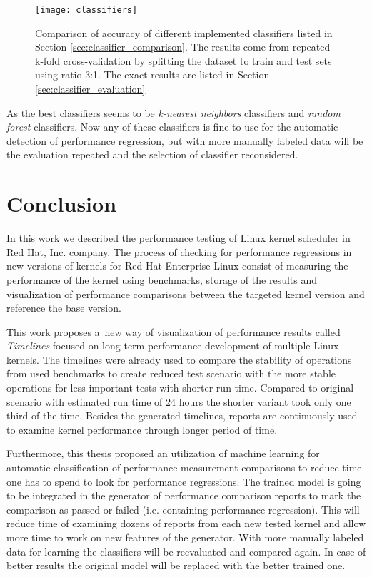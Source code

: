 \begin{figure}
  \centering
  \texttt{[image: classifiers]}
  \caption{Comparison of accuracy of different implemented classifiers listed in Section
    \ref{sec:classifier_comparison}. The results come from repeated k-fold
    cross-validation by splitting the dataset to train and test sets using ratio
    3:1. The exact results are listed in Section \ref{sec:classifier_evaluation}}
  \label{fig:classifiers}
\end{figure}

As the best classifiers seems to be \emph{k-nearest neighbors} classifiers and
\emph{random forest} classifiers. Now any of these classifiers is fine to use
for the automatic detection of performance regression, but with more manually
labeled data will be the evaluation repeated and the selection of classifier
reconsidered.



\chapter{Conclusion}
In this work we described the performance testing of Linux kernel scheduler in Red
Hat, Inc. company. The process of checking for performance regressions in new
versions of kernels for Red Hat Enterprise Linux consist of measuring the
performance of the kernel using benchmarks, storage of the results and
visualization of performance comparisons between the targeted kernel version and
reference the base version.

This work proposes a~new way of visualization of performance results called
\emph{Timelines} focused on long-term performance development of multiple Linux
kernels.
The timelines were already used to compare the stability of operations from used
benchmarks to create reduced test scenario with the more stable operations for
less important tests with shorter run time. Compared to original scenario with
estimated run time of 24 hours the shorter variant took only one third of the
time. Besides the generated timelines, reports are continuously used to examine
kernel performance through longer period of time.

Furthermore, this thesis proposed an utilization of machine learning for
automatic classification of performance measurement comparisons to reduce time
one has to spend to look for performance regressions.
The trained model is going to be integrated in the generator of performance
comparison reports to mark the comparison as passed or failed (i.e. containing
performance regression). This will reduce time of examining dozens of reports from
each new tested kernel and allow more time to work on new features of the
generator. With more manually labeled data for learning the classifiers will be
reevaluated and compared again. In case of better results the original model
will be replaced with the better trained one.

